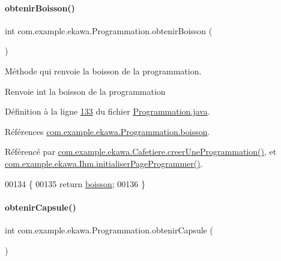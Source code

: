 \paragraph{\texorpdfstring{obtenir\+Boisson()}{obtenirBoisson()}}
{\footnotesize\ttfamily int com.\+example.\+ekawa.\+Programmation.\+obtenir\+Boisson (\begin{DoxyParamCaption}{ }\end{DoxyParamCaption})}



Méthode qui renvoie la boisson de la programmation. 

\begin{DoxyReturn}{Renvoie}
int la boisson de la programmation 
\end{DoxyReturn}


Définition à la ligne \hyperlink{_programmation_8java_source_l00133}{133} du fichier \hyperlink{_programmation_8java_source}{Programmation.\+java}.



Références \hyperlink{_programmation_8java_source_l00077}{com.\+example.\+ekawa.\+Programmation.\+boisson}.



Référencé par \hyperlink{_cafetiere_8java_source_l00731}{com.\+example.\+ekawa.\+Cafetiere.\+creer\+Une\+Programmation()}, et \hyperlink{_ihm_8java_source_l00668}{com.\+example.\+ekawa.\+Ihm.\+initialiser\+Page\+Programmer()}.


\begin{DoxyCode}
00134     \{
00135         \textcolor{keywordflow}{return} \hyperlink{classcom_1_1example_1_1ekawa_1_1_programmation_a625a85ed4d0b16f52382fd458e0e5657}{boisson};
00136     \}
\end{DoxyCode}
\mbox{\label{classcom_1_1example_1_1ekawa_1_1_programmation_a48d39b49a1250bbfaf51e4c32e934da0}} 
\paragraph{\texorpdfstring{obtenir\+Capsule()}{obtenirCapsule()}}
{\footnotesize\ttfamily int com.\+example.\+ekawa.\+Programmation.\+obtenir\+Capsule (\begin{DoxyParamCaption}{ }\end{DoxyParamCaption})}



